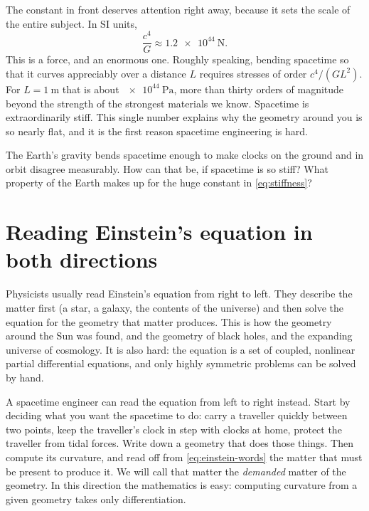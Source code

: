 The constant in front deserves attention right away, because it sets the scale
of the entire subject. In SI units,
\begin{equation}
  \frac{c^{4}}{G} \approx \SI{1.2e44}{\newton}.
  \label{eq:stiffness}
\end{equation}
This is a force, and an enormous one. Roughly speaking, bending spacetime so
that it curves appreciably over a distance $L$ requires stresses of order
$c^{4}/(G L^{2})$. For $L = \SI{1}{\metre}$ that is about
$\SI{e44}{\pascal}$, more than thirty orders of magnitude beyond the strength of
the strongest materials we know. Spacetime is extraordinarily stiff. This single
number explains why the geometry around you is so nearly flat, and it is the
first reason spacetime engineering is hard.

\begin{checkpoint}
The Earth's gravity bends spacetime enough to make clocks on the ground and in
orbit disagree measurably. How can that be, if spacetime is so stiff? What
property of the Earth makes up for the huge constant in
\cref{eq:stiffness}?
\end{checkpoint}

\section{Reading Einstein's equation in both directions}\label{sec:both-directions}

Physicists usually read Einstein's equation from right to left. They describe
the matter first (a star, a galaxy, the contents of the universe) and then
solve the equation for the geometry that matter produces. This is how the
geometry around the Sun was found, and the geometry of black holes, and the
expanding universe of cosmology. It is also hard: the equation is a set of
coupled, nonlinear partial differential equations, and only highly symmetric
problems can be solved by hand.

A spacetime engineer can read the equation from left to right instead. Start by
deciding what you want the spacetime to do: carry a traveller quickly between
two points, keep the traveller's clock in step with clocks at home, protect the
traveller from tidal forces. Write down a geometry that does those things. Then
compute its curvature, and read off from \cref{eq:einstein-words} the matter
that must be present to produce it. We will call that matter the
\emph{demanded} matter of the geometry. In this direction the mathematics is
easy: computing curvature from a given geometry takes only differentiation.

